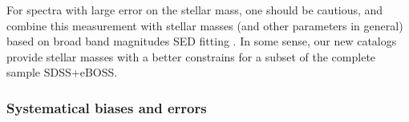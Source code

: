 \documentclass[onecolumn]{aa}
\begin{document}
For spectra with large error on the stellar mass, one should be cautious, and combine this measurement with stellar masses (and other parameters in general) based on broad band magnitudes SED fitting \citep[e.g.][for the same galaxies]{Maraston2013}. 
In some sense, our new catalogs provide stellar masses with a better constrains for a subset of the complete sample SDSS+eBOSS.

\subsubsection{Systematical biases and errors}
\end{document}

